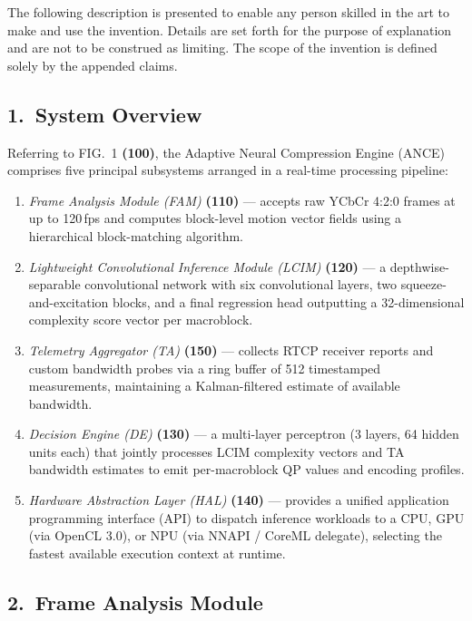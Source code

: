 \documentclass[12pt,letterpaper]{article}
\newcommand{\refnum}[1]{\textbf{(#1)}}
\newcommand{\defterm}[1]{\textit{#1}}
\begin{document}
The following description is presented to enable any person skilled in the art to make
and use the invention. Details are set forth for the purpose of explanation and are not
to be construed as limiting. The scope of the invention is defined solely by the appended
claims.

\subsection{1.~System Overview}

Referring to FIG.~1 \refnum{100}, the Adaptive Neural Compression Engine (ANCE)
comprises five principal subsystems arranged in a real-time processing pipeline:

\begin{enumerate}[label=\arabic*., leftmargin=2em, itemsep=3pt]
  \item \defterm{Frame Analysis Module (FAM)} \refnum{110} — accepts raw YCbCr 4:2:0
    frames at up to 120\,fps and computes block-level motion vector fields using a
    hierarchical block-matching algorithm.
  \item \defterm{Lightweight Convolutional Inference Module (LCIM)} \refnum{120} —
    a depthwise-separable convolutional network with six convolutional layers, two
    squeeze-and-excitation blocks, and a final regression head outputting a
    32-dimensional complexity score vector per macroblock.
  \item \defterm{Telemetry Aggregator (TA)} \refnum{150} — collects RTCP receiver
    reports and custom bandwidth probes via a ring buffer of 512 timestamped
    measurements, maintaining a Kalman-filtered estimate of available bandwidth.
  \item \defterm{Decision Engine (DE)} \refnum{130} — a multi-layer perceptron
    (3 layers, 64 hidden units each) that jointly processes LCIM complexity vectors
    and TA bandwidth estimates to emit per-macroblock QP values and encoding profiles.
  \item \defterm{Hardware Abstraction Layer (HAL)} \refnum{140} — provides a
    unified application programming interface (API) to dispatch inference workloads
    to a CPU, GPU (via OpenCL 3.0), or NPU (via NNAPI / CoreML delegate), selecting
    the fastest available execution context at runtime.
\end{enumerate}

\subsection{2.~Frame Analysis Module}
\end{document}
